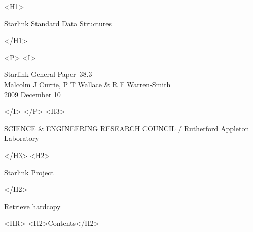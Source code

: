 \documentclass[twoside,11pt]{article}
\newcommand{\stardoccategory}  {Starlink General Paper}
\newcommand{\stardocnumber}    {38.3}
\newcommand{\stardocsource}    {sgp\stardocnumber}
\newcommand{\stardocauthors}   {Malcolm J Currie, P T Wallace \&
                                R F Warren-Smith}
\newcommand{\stardocdate}      {2009 December 10}
\newcommand{\stardoctitle}     {Starlink Standard Data Structures}
\newcommand{\htmladdnormallink}[2]{#1}
\newcommand{\htmladdimg}[1]{}
\newcommand{\htmlref}[2]{#1}
\newcommand{\htmladdtonavigation}[1]{}
\newcommand{\xlabel}[1]{}
\renewcommand{\_}{\texttt{\symbol{95}}}
\begin{document}
\begin{htmlonly}
   \xlabel{}
   \begin{rawhtml} <H1> \end{rawhtml}
      \stardoctitle
   \begin{rawhtml} </H1> \end{rawhtml}


   \begin{rawhtml} <P> <I> \end{rawhtml}
   \stardoccategory\ \stardocnumber \\
   \stardocauthors \\
   \stardocdate
   \begin{rawhtml} </I> </P> <H3> \end{rawhtml}
      SCIENCE \& ENGINEERING RESEARCH COUNCIL /
      \htmladdnormallink{Rutherford Appleton Laboratory}
                        {http://www.cclrc.ac.uk/ral} \\
   \begin{rawhtml} </H3> <H2> \end{rawhtml}
      \htmladdnormallink{Starlink Project}{http://www.starlink.ac.uk/}
   \begin{rawhtml} </H2> \end{rawhtml}
   \htmladdnormallink{\htmladdimg{source.gif} Retrieve hardcopy}
      {http://www.starlink.ac.uk/cgi-bin/hcserver?\stardocsource}\\

  \label{stardoccontents}
  \begin{rawhtml}
    <HR>
    <H2>Contents</H2>
  \end{rawhtml}
  \htmladdtonavigation{\htmlref{\htmladdimg{contents_motif.gif}}
        {stardoccontents}}


\end{htmlonly}
\end{document}
